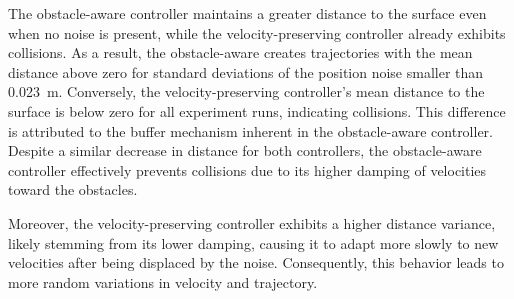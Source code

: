 The obstacle-aware controller maintains a greater distance to the surface even when no noise is present, while the velocity-preserving controller already exhibits collisions. As a result, the obstacle-aware creates trajectories with the mean distance above zero for standard deviations of the position noise smaller than \qty{0.023}{m}. Conversely, the velocity-preserving controller's mean distance to the surface is below zero for all experiment runs, indicating collisions.
This difference is attributed to the buffer mechanism inherent in the obstacle-aware controller. Despite a similar decrease in distance for both controllers, the obstacle-aware controller effectively prevents collisions due to its higher damping of velocities toward the obstacles.

Moreover, the velocity-preserving controller exhibits a higher distance variance, likely stemming from its lower damping, causing it to adapt more slowly to new velocities after being displaced by the noise. Consequently, this behavior leads to more random variations in velocity and trajectory.

